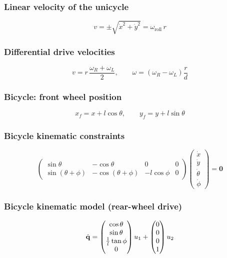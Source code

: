 \subsubsection{Linear velocity of the unicycle}
\begin{equation*}
    v=\pm\sqrt{\dot x^2+\dot y^2}=\omega_{\text{roll}}\,r
\end{equation*}

\subsubsection{Differential drive velocities}
\begin{equation*}
    v=r\,\frac{\omega_R+\omega_L}{2},\qquad \omega=(\omega_R-\omega_L)\frac{r}{d}
\end{equation*}

\subsubsection{Bicycle: front wheel position}
\begin{equation*}
    x_f=x+l\cos\theta,\qquad y_f=y+l\sin\theta
\end{equation*}

\subsubsection{Bicycle kinematic constraints}
\begin{equation*}
    \begin{pmatrix}
        \sin\theta&-\cos\theta&0&0\\
        \sin(\theta+\phi)&-\cos(\theta+\phi)&-l\cos\phi&0
    \end{pmatrix}\begin{pmatrix}\dot x\\\dot y\\\dot\theta\\\dot\phi\end{pmatrix}=\mathbf 0
\end{equation*}

\subsubsection{Bicycle kinematic model (rear-wheel drive)}
\begin{equation*}
    {\dot{\mathbf q}}=\begin{pmatrix}\cos\theta\\\sin\theta\\\frac{1}{l}\tan\phi\\0\end{pmatrix}u_1+\begin{pmatrix}0\\0\\0\\1\end{pmatrix}u_2
\end{equation*}


